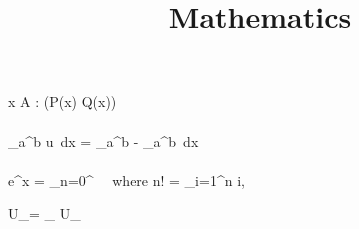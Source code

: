 \documentclass[source]{classes/uva-inf-article}
\title{Mathematics}
\begin{document}
\maketitle

\textbf\forall x \in A : (P(x) \longrightarrow Q(x))\\\\

\int_{a}^{b} u  \,dx = _{a}^{b} - \int_{a}^{b}   \,dx\\\\

e^x = \sum_{n=0}^{\infty} \ \ where \quad n! = \prod_{i=1}^{n} i,

\quad U_\alpha = \cap_{\alpha} U_\alpha
\end{document}
